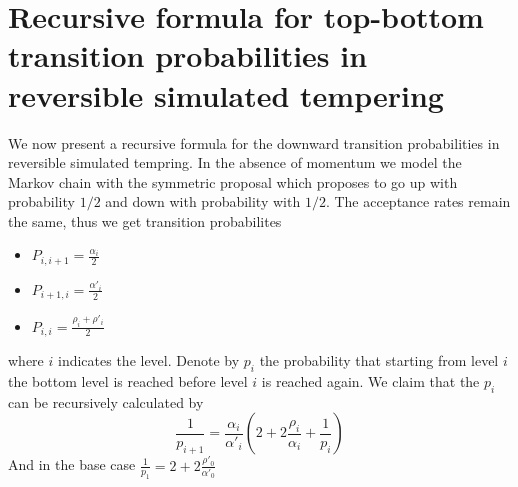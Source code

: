 \documentclass{article}
\begin{document}
\section{Recursive formula for top-bottom transition probabilities in reversible
simulated tempering}
We now present a recursive formula for the downward transition probabilities in
reversible simulated tempring. In the absence of momentum we model the Markov
chain with the symmetric proposal which proposes to go up with probability $1/2$
and down with probability with $1/2$. The acceptance rates remain the same, thus
we get transition probabilites
\begin{itemize}
    \item $P_{i,i+1} = \frac{\alpha_i}{2}$
    \item $P_{i+1,i} = \frac{\alpha'_i}{2}$
    \item $P_{i,i} = \frac{\rho_i+\rho'_i}{2}$
\end{itemize}
where $i$ indicates the level. Denote by $p_i$ the probability that starting
from level $i$ the bottom level is reached before level $i$ is reached again.
We claim that the $p_i$ can be recursively calculated by
\[ \frac{1}{p_{i+1}} =
\frac{\alpha_i}{\alpha'_i}\left(2+2\frac{\rho_i}{\alpha_i} +
\frac{1}{p_i}\right)\]
And in the base case $\frac{1}{p_1} = 2+2\frac{\rho'_0}{\alpha'_0}$
\end{document}
